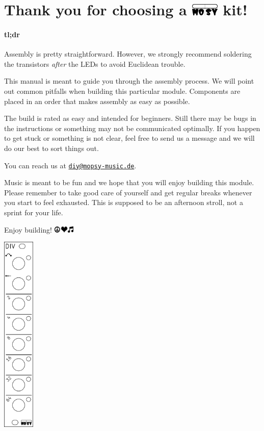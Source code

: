 \documentclass[a4paper,
               11pt,
               parskip=half,
               headinclude,
               titlepage=false]{scrartcl}
\begin{document}
\begin{minipage}{12.5cm}
\setlength{\parskip}{\medskipamount}
\section*{Thank you for choosing a \includegraphics[height=0.8em]{moPsy_logo} kit!}

\paragraph{tl;dr} Assembly is pretty straightforward. However, we strongly recommend soldering the transistors \emph{after} the LEDs to avoid Euclidean trouble.

This manual is meant to guide you through the assembly process.
We will point out common pitfalls when building this particular module.
Components are placed in an order that makes assembly as easy as possible.

The build is rated as {\color{level_easy}easy} and intended for {\color{level_easy}beginners}.
Still there may be bugs in the instructions or something may not be communicated optimally.
If you happen to get stuck or something is not clear, feel free to send us a message and we will do our best to sort things out.

You can reach us at \href{mailto:diy@mopsy-music.de}{\texttt{diy@mopsy-music.de}}.

Music is meant to be fun and we hope that you will enjoy building this module.
Please remember to take good care of yourself and get regular breaks whenever you start to feel exhausted. This is supposed to be an afternoon stroll, not a sprint for your life.

\vspace{1em}
Enjoy building! \quad \includegraphics[height=0.8em]{peace_love_music}

\end{minipage}
\hspace{0.5cm}
\begin{minipage}{1.5cm}
\includegraphics[width=1.5cm]{div-frontpanel}
\end{minipage}
\end{document}
